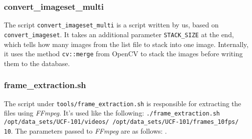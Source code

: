 \subsubsection{convert\_imageset\_multi}
The script \texttt{convert\_imageset\_multi} is a script written by us, based on \texttt{convert\_imageset}.
It takes an additional parameter \texttt{STACK\_SIZE} at the end, which tells how many images from the list file to stack into one image.
Internally, it uses the method \texttt{cv::merge} from OpenCV to stack the images before writing them to the database.

\subsubsection{frame\_extraction.sh}
\label{subsec:frame_extraction}

The script under \texttt{tools/frame\_extraction.sh} is responsible for extracting the files using \emph{FFmpeg}.
It's used like the following: \texttt{./frame\_extraction.sh /opt/data\_sets/UCF-101/videos/ /opt/data\_sets/UCF-101/frames\_10fps/ 10}.
The parameters passed to \emph{FFmpeg} are as follows: .


